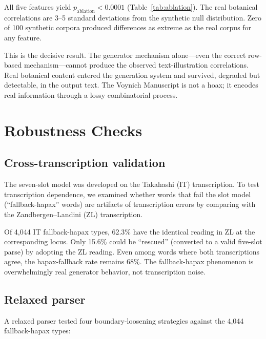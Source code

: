 \documentclass[12pt]{article}
\begin{document}
All five features yield $p_{\text{ablation}} < 0.0001$ (Table~\ref{tab:ablation}). The real botanical correlations are 3--5 standard deviations from the synthetic null distribution. Zero of 100 synthetic corpora produced differences as extreme as the real corpus for any feature.

This is the decisive result. The generator mechanism alone---even the correct row-based mechanism---cannot produce the observed text-illustration correlations. Real botanical content entered the generation system and survived, degraded but detectable, in the output text. The Voynich Manuscript is not a hoax; it encodes real information through a lossy combinatorial process.

\section{Robustness Checks}
\label{sec:robustness}

\subsection{Cross-transcription validation}

The seven-slot model was developed on the Takahashi (IT) transcription. To test transcription dependence, we examined whether words that fail the slot model (``fallback-hapax'' words) are artifacts of transcription errors by comparing with the Zandbergen--Landini (ZL) transcription.

Of 4,044 IT fallback-hapax types, 62.3\% have the identical reading in ZL at the corresponding locus. Only 15.6\% could be ``rescued'' (converted to a valid five-slot parse) by adopting the ZL reading. Even among words where both transcriptions agree, the hapax-fallback rate remains 68\%. The fallback-hapax phenomenon is overwhelmingly real generator behavior, not transcription noise.

\subsection{Relaxed parser}

A relaxed parser tested four boundary-loosening strategies against the 4,044 fallback-hapax types:
\end{document}
